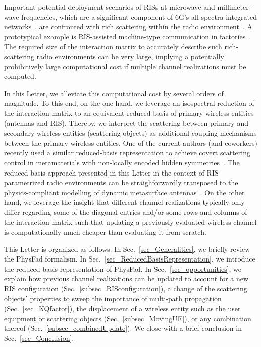 \documentclass[journal,12pt,onecolumn,draftclsnofoot]{IEEEtran}
\begin{document}
Important potential deployment scenarios of RISs at microwave and millimeter-wave frequencies, which are a significant component of 6G’s all-spectra-integrated networks~\cite{you2021towards}, are confronted with rich scattering within the radio environment~\cite{GeorgeMag}. A prototypical example is RIS-assisted machine-type communication in factories~\cite{giordani2020toward}. 
The required size of the interaction matrix to accurately describe such rich-scattering radio environments can be very large, implying a potentially prohibitively large computational cost if multiple channel realizations must be computed.

In this Letter, we alleviate this computational cost by several orders of magnitude. To this end, on the one hand, we leverage an isospectral reduction of the interaction matrix to an equivalent reduced basis of primary wireless entities (antennas and RIS). Thereby, we interpret the scattering between primary and secondary wireless entities (scattering objects) as additional coupling mechanisms between the primary wireless entities.
One of the current authors (and coworkers) recently used a similar reduced-basis representation to achieve covert scattering control in metamaterials with non-locally encoded hidden symmetries~\cite{HiddenSymmetry}. The reduced-basis approach presented in this Letter in the context of RIS-parametrized radio environments can be straighforwardly transposed to the physics-compliant modelling of dynamic metasurface antennas~\cite{yoo2019analytic,williams2022electromagnetic}.
On the other hand, we leverage the insight that different channel realizations typically only differ regarding some of the diagonal entries and/or some rows and columns of the interaction matrix such that updating a previously evaluated wireless channel is computationally much cheaper than evaluating it from scratch.

This Letter is organized as follows. In Sec.~\ref{sec_Generalities}, we briefly review the PhysFad formalism. In Sec.~\ref{sec_ReducedBasisRepresentation}, we introduce the reduced-basis representation of PhysFad. 
In Sec.~\ref{sec_opportunities}, we explain how previous channel realizations can be updated to account for a new RIS configuration (Sec.~\ref{subsec_RISconfiguration}), a change of the scattering objects' properties to sweep the importance of multi-path propagation (Sec.~\ref{sec_KQfactor}), the displacement of a wireless entity such as the user equipment or scattering objects (Sec.~\ref{subsec_MovingUE}), or any combination thereof (Sec.~\ref{subsec_combinedUpdate}).
We close with a brief conclusion %
in Sec.~\ref{sec_Conclusion}.
\end{document}

